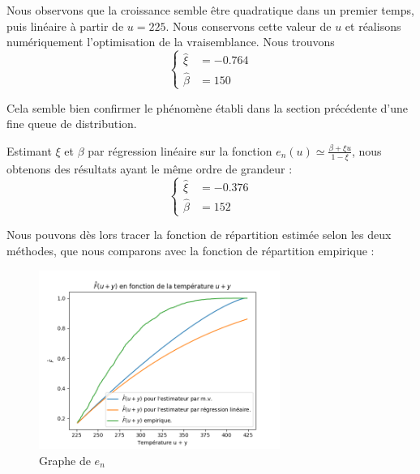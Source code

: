 \documentclass[../report.tex]{subfiles}
\begin{document}
\par Nous observons que la croissance semble être quadratique dans un premier temps, puis linéaire à partir de $u = 225$. Nous conservons cette valeur de $u$ et réalisons numériquement l'optimisation de la vraisemblance. Nous trouvons 
\begin{displaymath}
\begin{cases}
\hat{\xi} &= -0.764\\
\hat{\beta} &= 150
\end{cases}
\end{displaymath}

\par Cela semble bien confirmer le phénomène établi dans la section précédente d'une fine queue de distribution.

\par Estimant $\xi$ et $\beta$ par régression linéaire sur la fonction $e_n \left( u \right) \simeq \frac{\beta + \xi u}{1 - \xi}$, nous obtenons des résultats ayant le même ordre de grandeur : 
\begin{displaymath}
\begin{cases}
\hat{\xi} &= -0.376\\
\hat{\beta} &= 152
\end{cases}
\end{displaymath}

\par Nous pouvons dès lors tracer la fonction de répartition estimée selon les deux méthodes, que nous comparons avec la fonction de répartition empirique :
\begin{figure}[H]
  \centering
    \includegraphics[width=0.7\textwidth]{images/part_2/repartition.png}
  \caption{Graphe de $e_n$}
\end{figure}
\end{document}

